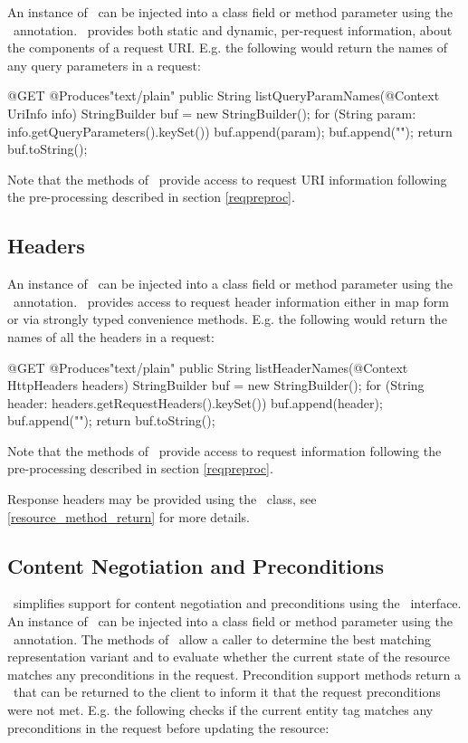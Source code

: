 An instance of \UriInfo\ can be injected into a class field or method parameter using the \Context\ annotation. \UriInfo\ provides both static and dynamic, per-request information, about the components of a request URI. E.g. the following would return the names of any query parameters in a request:

\begin{listing}{1}
@GET
@Produces{"text/plain"}
public String listQueryParamNames(@Context UriInfo info) {
  StringBuilder buf = new StringBuilder();
  for (String param: info.getQueryParameters().keySet()) {
    buf.append(param);
    buf.append("\n");
  }
  return buf.toString();
}
\end{listing}

Note that the methods of \UriInfo\ provide access to request URI information following the pre-processing described in section \ref{reqpreproc}.

\subsection{Headers}
\label{httpheaders}

An instance of \HttpHeaders\ can be injected into a class field or method parameter using the \Context\ annotation. \HttpHeaders\ provides access to request header information either in map form or via strongly typed convenience methods. E.g. the following would return the names of all the headers in a request:

\begin{listing}{1}
@GET
@Produces{"text/plain"}
public String listHeaderNames(@Context HttpHeaders headers) {
  StringBuilder buf = new StringBuilder();
  for (String header: headers.getRequestHeaders().keySet()) {
    buf.append(header);
    buf.append("\n");
  }
  return buf.toString();
}
\end{listing}

Note that the methods of \HttpHeaders\ provide access to request information following the pre-processing described in section \ref{reqpreproc}.

Response headers may be provided using the \Response\ class, see \ref{resource_method_return} for more details.

\subsection{Content Negotiation and Preconditions}
\label{conneg_and_preconditions}

\jaxrs\ simplifies support for content negotiation and preconditions using the \Request\ interface. An instance of \Request\ can be injected into a class field or method parameter using the \Context\ annotation. The methods of \Request\ allow a caller to determine the best matching representation variant and to evaluate whether the current state of the resource matches any preconditions in the request. Precondition support methods return a \ResponseBuilder\ that can be returned to the client to inform it that the request preconditions were not met. E.g. the following checks if the current entity tag matches any preconditions in the request before updating the resource:

